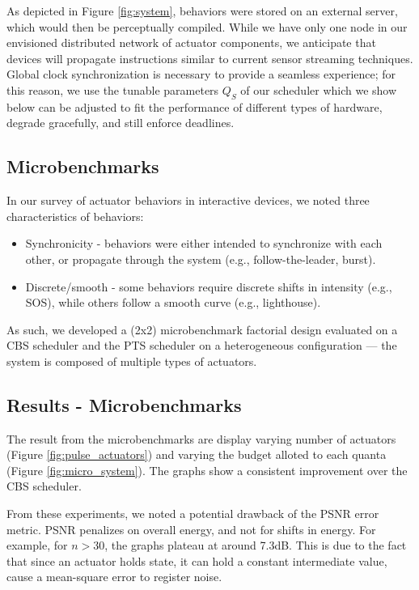 \documentclass{sigchi}
\newcommand*{\schedule}[1]{{\textbf{\small{\fontfamily{cmss}\selectfont{#1}}}}}
\begin{document}
  As depicted in Figure \ref{fig:system}, behaviors were stored on an external server, which would then be perceptually compiled. While we have only one node in our envisioned distributed network of actuator components, we anticipate that devices will propagate instructions similar to current sensor streaming techniques. Global clock synchronization is necessary to provide a seamless experience; for this reason, we use the tunable parameters $Q_S$ of our \schedule{PS-T} scheduler which we show below can be adjusted to fit the performance of different types of hardware, degrade gracefully, and still enforce deadlines. 


  \subsection{Microbenchmarks}
  In our survey of actuator behaviors in interactive devices, we noted three characteristics of behaviors: 
    \begin{itemize}
    \item Synchronicity - behaviors were either intended to synchronize with each other, or propagate through the system (e.g., follow-the-leader, burst).
    \item Discrete/smooth - some behaviors require discrete shifts in intensity (e.g., SOS), while others follow a smooth curve (e.g., lighthouse). 
    \end{itemize}

  As such, we developed a (2x2) microbenchmark factorial design evaluated on a CBS scheduler and the PTS scheduler on a heterogeneous configuration --- the system is composed of multiple types of actuators. 

  \pagebreak
  \subsection{Results - Microbenchmarks}
  The result from the microbenchmarks are display varying number of actuators (Figure \ref{fig:pulse_actuators}) and varying the budget alloted to each quanta (Figure \ref{fig:micro_system}). The graphs show a consistent improvement over the CBS scheduler. 

  From these experiments, we noted a potential drawback of the PSNR error metric. PSNR penalizes on overall energy, and not for shifts in energy. For example, for $n > 30$, the graphs plateau at around 7.3dB. This is due to the fact that since an actuator holds state, it can hold a constant intermediate value, cause a mean-square error to register noise.
\end{document}
